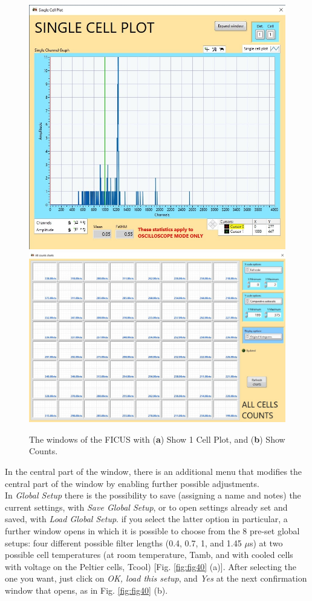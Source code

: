 \documentclass[a4paper,12pt,oneside,pdflatex,italian,final,twocolumn]{article}
\begin{document}
\begin{figure}[h]
\centering
\subfloat
{\includegraphics[width=.35\textwidth]{Capture54.jpg}} \quad
\subfloat
{\includegraphics[width=.55\textwidth]{Capture55.jpg}} \\
\caption{The windows of the FICUS with (\textbf{a}) Show 1 Cell Plot, and (\textbf{b}) Show Counts.}\label{fig:fig39}
\end{figure}

In the central part of the window, there is an additional menu that modifies the central part of the window by enabling further possible adjustments. \\
In \textit{Global Setup} there is the possibility to save (assigning a name and notes) the current settings, with \textit{Save Global Setup}, or to open settings already set and saved, with \textit{Load Global Setup}. if you select the latter option in particular, a further window opens in which it is possible to choose from the 8 pre-set global setups: four different possible filter lengths (0.4, 0.7, 1, and 1.45 $\mu$s) at two possible cell temperatures (at room temperature, Tamb, and with cooled cells with voltage on the Peltier cells, Tcool) [Fig. \ref{fig:fig40} (a)]. After selecting the one you want, just click on \textit{OK, load this setup}, and \textit{Yes} at the next confirmation window that opens, as in Fig. \ref{fig:fig40} (b).
\end{document}
